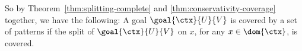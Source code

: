 So by Theorem~\ref{thm:splitting-complete} and \ref{thm:conservativity-coverage} together, we have the following:
A goal $\goal{\ctx}{U}{V}$ is covered by a set of patterns if the split of $\goal{\ctx}{U}{V}$ on $x$, for any $x \in \dom{\ctx}$, is covered.

